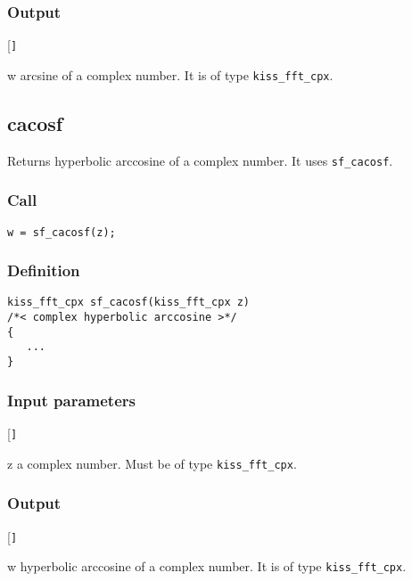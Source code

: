 \subsubsection*{Output}
\begin{desclist}{\tt }{\quad}[\tt ]
   \setlength\itemsep{0pt}
   \item[w] arcsine of a complex number. It is of type \texttt{kiss\_fft\_cpx}.
\end{desclist}




\subsection{{cacosf}}
Returns hyperbolic arccosine of a complex number. It uses \texttt{sf\_cacosf}.

\subsubsection*{Call}
\begin{verbatim}w = sf_cacosf(z);\end{verbatim}

\subsubsection*{Definition}
\begin{verbatim}
kiss_fft_cpx sf_cacosf(kiss_fft_cpx z)
/*< complex hyperbolic arccosine >*/
{
   ...
}
\end{verbatim}

\subsubsection*{Input parameters}
\begin{desclist}{\tt }{\quad}[\tt ]
   \setlength\itemsep{0pt}
   \item[z] a complex number. Must be of type \texttt{kiss\_fft\_cpx}.
\end{desclist}

\subsubsection*{Output}
\begin{desclist}{\tt }{\quad}[\tt ]
   \setlength\itemsep{0pt}
   \item[w] hyperbolic arccosine of a complex number. It is of type \texttt{kiss\_fft\_cpx}.
\end{desclist}




